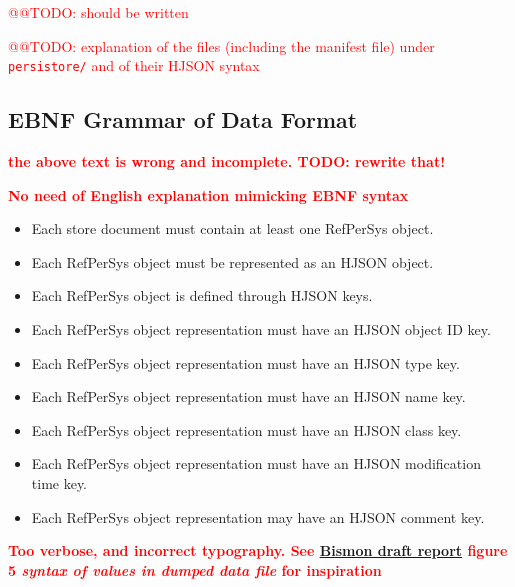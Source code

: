 \documentclass[11pt,a4paper,svgnames]{article}
\begin{document}
\textcolor{red}{@@TODO: should be written}

\textcolor{red}{@@TODO: explanation of the files (including the
  manifest file) under \texttt{persistore/} and of their HJSON syntax}

\subsection{EBNF Grammar of Data Format}
\label{subsec:data-format-ebnf}

\textcolor{red}{\textbf{the above text is wrong and incomplete. TODO: rewrite that!}}

 \textcolor{red}{\textbf{No need of English explanation mimicking EBNF syntax}}

 \begin{itemize}
  \item Each store document must contain at least one RefPerSys object.
  \item Each RefPerSys object must be represented as an HJSON object.
  \item Each RefPerSys object is defined through HJSON keys.
  \item Each RefPerSys object representation must have an HJSON object ID key.
  \item Each RefPerSys object representation must have an HJSON type key.
  \item Each RefPerSys object representation must have an HJSON  name key.
  \item Each RefPerSys object representation must have an HJSON class key.
  \item Each RefPerSys object representation must have an HJSON modification time key.
  \item Each RefPerSys object representation may have an HJSON comment key.
\end{itemize}

\textcolor{red}{\textbf{Too verbose, and incorrect typography. See
    \href{http://starynkevitch.net/Basile/bismon-chariot-doc.pdf}{Bismon
      draft report} figure 5 \emph{syntax of values in dumped data
    file} for inspiration}}
\end{document}
